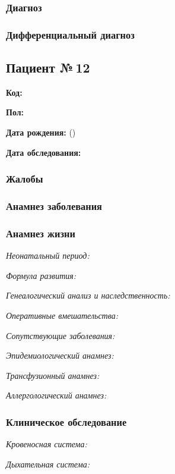 \documentclass[a4paper,14pt]{extarticle}
\begin{document}
\subsubsection*{Диагноз}

\subsubsection*{Дифференциальный диагноз}

\newpage
\subsection*{Пациент №\,12}

\textbf{Код:} 

\textbf{Пол:}

\textbf{Дата рождения:}  ()

\textbf{Дата обследования:} 

\subsubsection*{Жалобы}

\subsubsection*{Анамнез заболевания}

\subsubsection*{Анамнез жизни}

\emph{Неонатальный период:}

\emph{Формула развития:}

\emph{Генеалогический анализ и наследственность:}

\emph{Оперативные вмешательства:}

\emph{Сопутствующие заболевания:}

\emph{Эпидемиологический анамнез:}

\emph{Трансфузионный анамнез:}

\emph{Аллергологический анамнез:}

\subsubsection*{Клиническое обследование}

\emph{Кровеносная система:}

\emph{Дыхательная система:}
\end{document}
